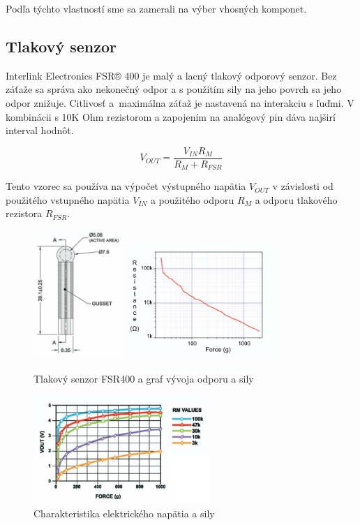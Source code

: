 Podľa týchto vlastností sme sa zamerali na výber vhosných komponet.

\subsection*{Tlakový senzor}

Interlink Electronics FSR® 400 je malý a lacný tlakový odporový senzor. Bez záťaže sa správa ako nekonečný odpor a s použitím sily na jeho povrch sa jeho odpor znižuje. Citlivosť a~maximálna záťaž je nastavená na interakciu s ľuďmi. \cite{fsr400} V kombinácii s 10K Ohm rezistorom a zapojením na analógový pin dáva najširí interval hodnôt. 

\[
V_{OUT} = \frac{V_{IN} R_M} {R_M + R_{FSR}}
\]

Tento vzorec sa používa na výpočet výstupného napätia $V_{OUT}$ v závislosti od použitého vstupného napätia $V_{IN}$ a použitého odporu $R_M$ a odporu tlakového rezistora $R_{FSR}$.

\begin{figure}[hbt]
	\centering
	\includegraphics[width=0.3\textwidth]{obrazky-figures/fsr400.png}
	\includegraphics[width=0.5\textwidth]{obrazky-figures/FSRodporSila.png}
	\caption{Tlakový senzor FSR400 a graf vývoja odporu a sily}
	\label{Odpor sila}
\end{figure}

\begin{figure}[hbt]
	\centering
	\includegraphics[width=0.6\textwidth]{obrazky-figures/fsr-charakteristikaV-force.png}
	\caption{Charakteristika elektrického napätia a sily}
	\label{Characteristics}
\end{figure}

